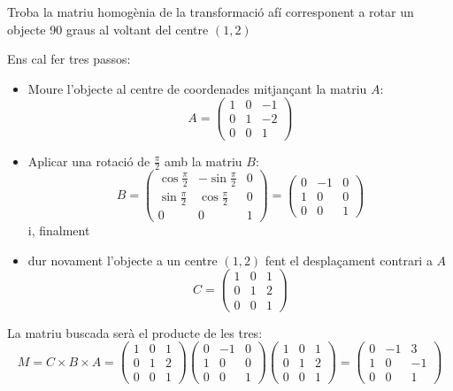 \Exercise Troba la matriu homogènia de la transformació afí corresponent a rotar un objecte 90 graus al voltant del centre \((1,2)\) 

\Answer 
Ens cal fer tres passos:
\begin{itemize}
    \item Moure l’objecte al centre de coordenades mitjançant la matriu \(A\):
    \[ A=\begin {pmatrix}1&0&-1\\0&1&-2\\0&0&1\end {pmatrix} \]
    \item Aplicar una rotació de \(\frac {\pi }{2}\) amb la matriu \(B\):
    \[B=\begin {pmatrix}\cos {\frac {\pi }{2}}&-\sin {\frac {\pi }{2}}&0\\\sin {\frac {\pi }{2}}&\cos {\frac {\pi }{2}}&0\\0&0&1\end {pmatrix}=\begin {pmatrix}0&-1&0\\1&0&0\\0&0&1\end {pmatrix} \] 
    i, finalment
    \item  dur novament l’objecte a un centre \((1,2)\) fent el desplaçament contrari a \(A\)
    \[ C=\begin {pmatrix}1&0&1\\0&1&2\\0&0&1\end {pmatrix} \]
\end{itemize}

La matriu buscada serà el producte de les tres:
\[ M=C\times B\times A= \begin {pmatrix}1&0&1\\0&1&2\\0&0&1\end {pmatrix}\begin {pmatrix}0&-1&0\\1&0&0\\0&0&1\end {pmatrix}\begin {pmatrix}1&0&1\\0&1&2\\0&0&1\end {pmatrix}= \begin {pmatrix}0&-1&3\\1&0&-1\\0&0&1\end {pmatrix} \]

\blacksquare
